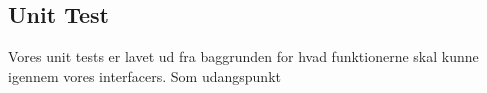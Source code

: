 \subsection{Unit Test}

Vores unit tests er lavet ud fra baggrunden for hvad funktionerne skal kunne igennem vores interfacers.
Som udangspunkt  


